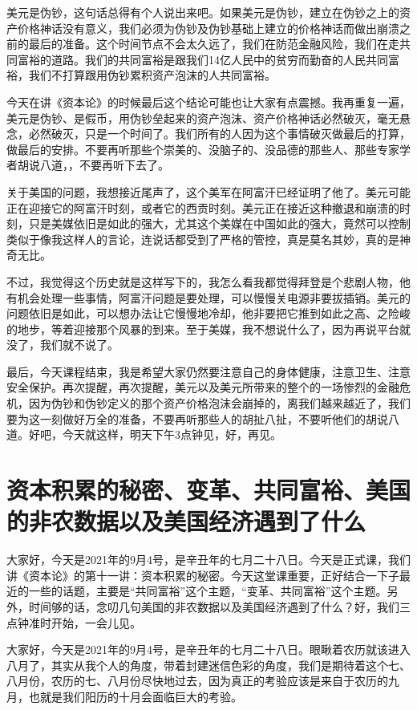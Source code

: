 \documentclass[UTF8, 12pt, a4paper]{ctexrep}
\begin{document}
美元是伪钞，这句话总得有个人说出来吧。如果美元是伪钞，建立在伪钞之上的资产价格神话没有意义，我们必须为伪钞及伪钞基础上建立的价格神话而做出崩溃之前的最后的准备。这个时间节点不会太久远了，我们在防范金融风险，我们在走共同富裕的道路。我们的共同富裕是跟我们14亿人民中的贫穷而勤奋的人民共同富裕，我们不打算跟用伪钞累积资产泡沫的人共同富裕。

今天在讲《资本论》的时候最后这个结论可能也让大家有点震撼。我再重复一遍，美元是伪钞、是假币，用伪钞垒起来的资产泡沫、资产价格神话必然破灭，毫无悬念，必然破灭，只是一个时间了。我们所有的人因为这个事情破灭做最后的打算，做最后的安排。不要再听那些个崇美的、没脑子的、没品德的那些人、那些专家学者胡说八道，，不要再听下去了。

关于美国的问题，我想接近尾声了，这个美军在阿富汗已经证明了他了。美元可能正在迎接它的阿富汗时刻，或者它的西贡时刻。美元正在接近这种撤退和崩溃的时刻，只是美媒依旧是如此的强大，尤其这个美媒在中国如此的强大，竟然可以控制类似于像我这样人的言论，连说话都受到了严格的管控，真是莫名其妙，真的是神奇无比。

不过，我觉得这个历史就是这样写下的，我怎么看我都觉得拜登是个悲剧人物，他有机会处理一些事情，阿富汗问题是要处理，可以慢慢关电源非要拔插销。美元的问题依旧是如此，可以想办法让它慢慢地冷却，他非要把它推到如此之高、之险峻的地步，等着迎接那个风暴的到来。至于美媒，我不想说什么了，因为再说平台就没了，我们就不说了。

最后，今天课程结束，我是希望大家仍然要注意自己的身体健康，注意卫生、注意安全保护。再次提醒，再次提醒，美元以及美元所带来的整个的一场惨烈的金融危机，因为伪钞和伪钞定义的那个资产价格泡沫会崩掉的，离我们越来越近了，我们要为这一刻做好万全的准备，不要再听那些人的胡扯八扯，不要听他们的胡说八道。好吧，今天就这样，明天下午3点钟见，好，再见。

\section{资本积累的秘密、变革、共同富裕、美国的非农数据以及美国经济遇到了什么}

大家好，今天是2021年的9月4号，是辛丑年的七月二十八日。今天是正式课，我们讲《资本论》的第十一讲：资本积累的秘密。今天这堂课重要，正好结合一下子最近的一些的话题，主要是“共同富裕”这个主题，“变革、共同富裕”这个主题。另外，时间够的话，念叨几句美国的非农数据以及美国经济遇到了什么？好，我们三点钟准时开始，一会儿见。

大家好，今天是2021年的9月4号，是辛丑年的七月二十八日。眼瞅着农历就该进入八月了，其实从我个人的角度，带着封建迷信色彩的角度，我们是期待着这个七、八月份，农历的七、八月份尽快地过去，因为真正的考验应该是来自于农历的九月，也就是我们阳历的十月会面临巨大的考验。
\end{document}
